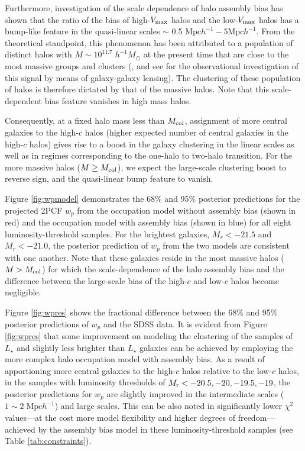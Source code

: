 \documentclass[12pt, preprint]{aastex}
\begin{document}
Furthermore, investigation of the scale dependence of halo assembly bias has shown that the ratio of the bias of high-$V_{\rm max}$ halos and the low-$V_{\rm max}$ halos has a bump-like feature in the quasi-linear scales $\sim$ 0.5 $\mathrm{Mpc}h^{-1}-5\mathrm{Mpc}h^{-1}$. From the theoretical standpoint, this phenomenon has been attributed to a population of distinct halos with $M \sim 10^{11.7} \; h^{-1}M_{\odot}$ at the present time that are close to the most massive groups and clusters (\citealt{sunayama2016}, and see \citealt{more2016} for the observational investigation of this signal by means of galaxy-galaxy lensing). The clustering of these population of halos is therefore dictated by that of the massive halos. Note that this scale-dependent bias feature vanishes in high mass halos. 

Consequently, at a fixed halo mass less than $M_{\rm col}$, assignment of more central galaxies to the high-$c$ halos (higher expected number of central galaxies in the high-$c$ halos) gives rise to a boost in the galaxy clustering in the linear scales as well as in regimes corresponding to the one-halo to two-halo transition. For the more massive halos ($M \geq M_{\rm col}$), we expect the large-scale clustering boost to reverse sign, and the quasi-linear bump feature to vanish.  

Figure \ref{fig:wpmodel} demonstrates the 68$\%$ and 95$\%$ posterior predictions for the projected 2PCF $w_{p}$ from the occupation model without assembly bias (shown in red) and the occupation model with assembly bias (shown in blue) for all eight luminosity-threshold samples. For the brightest galaxies, $M_{r} < -21.5$ and $M_{r} < -21.0$, the posterior prediction of $w_{p}$ from the two models are consistent with one another. Note that these galaxies reside in the most massive halos ($M > M_{\rm col}$) for which the scale-dependence of the halo assembly bias and the difference between the large-scale bias of the high-$c$ and low-$c$ halos become negligible. 

Figure \ref{fig:wpres} shows the fractional difference between the 68$\%$ and 95$\%$ posterior predictions of $w_p$ and the SDSS data. It is evident from Figure \ref{fig:wpres} that some improvement on modeling the clustering of the samples of $L_{\star}$ and slightly less brighter than $L_{\star}$ galaxies can be achieved by employing the more complex halo occupation model with assembly bias. As a result of apportioning more central galaxies to the high-$c$ halos relative to the low-$c$ halos, in the samples with luminosity thresholds of $M_{\rm r}<-20.5, -20, -19.5, -19$, the posterior predictions for $w_{p}$ are slightly improved in the intermediate scales ($1\sim 2 \; \mathrm{Mpc} h^{-1}$) and large scales. This can be also noted in significantly lower $\chi^{2}$ values---at the cost more model flexibility and higher degrees of freedom---achieved by the assembly bias model in these luminosity-threshold samples (see Table \ref{tab:constraints}).  
\end{document}

